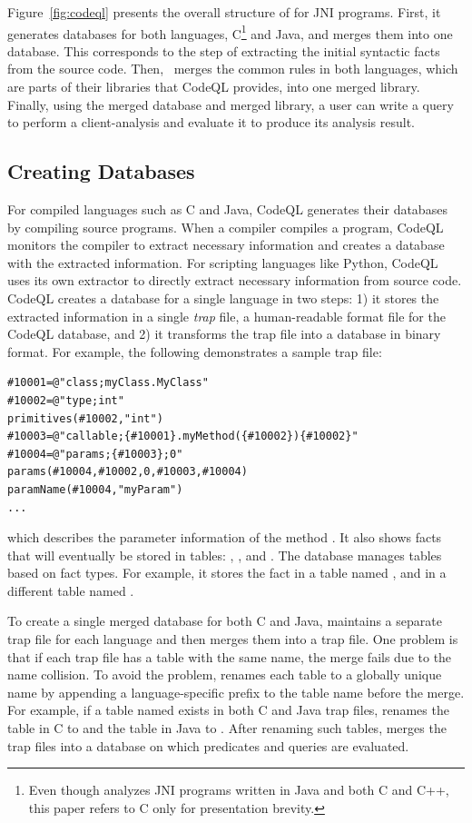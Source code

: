 Figure~\ref{fig:codeql} presents the overall structure of \ours for JNI
programs.  First, it generates databases for both languages, C\footnote{ Even
though \ours analyzes JNI programs written in Java and both C and C++, this
paper refers to C only for presentation brevity.} and Java, and merges them
into one database.  This corresponds to the step of extracting the initial
syntactic facts from the source code.  Then, \ours~merges the common rules in
both languages, which are parts of their libraries that CodeQL provides, into
one merged library.  Finally, using the merged database and merged library, a
user can write a query to perform a client-analysis and evaluate it to produce
its analysis result.

\subsection{Creating Databases}
For compiled languages such as C and Java, CodeQL generates their databases by
compiling source programs.  When a compiler compiles a program, CodeQL monitors
the compiler to extract necessary information and creates a database with the
extracted information. For scripting languages like Python, CodeQL uses its own
extractor to directly extract necessary information from source code.  CodeQL
creates a database for a single language in two steps: 1) it stores the
extracted information in a single \textit{trap} file, a human-readable format file for
the CodeQL database, and 2) it transforms the trap file into a database in
binary format.  For example, the following demonstrates a sample trap file:

\begin{lstlisting}[style=java,numbers=none]
#10001=@"class;myClass.MyClass"
#10002=@"type;int"
primitives(#10002,"int")
#10003=@"callable;{#10001}.myMethod({#10002}){#10002}"
#10004=@"params;{#10003};0"
params(#10004,#10002,0,#10003,#10004)
paramName(#10004,"myParam")
...
\end{lstlisting}

\noindent
which describes the parameter information of the method .
It also shows facts that will eventually be stored in tables:
, , and
.  The database manages tables based on fact types.
For example, it stores the fact  in a table named
, and  in a different table named
.

To create a single merged database for both C and Java, \ours maintains a
separate trap file for each language and then merges them into a trap file.
One problem is that if each trap file has a table with the same name, the merge
fails due to the name collision.  To avoid the problem, \ours renames each
table to a globally unique name by appending a language-specific prefix to the
table name before the merge.  For example, if a table named 
exists in both C and Java trap files, \ours renames the table in C to
 and the table in Java to .  After
renaming such tables, \ours merges the trap files into a database on which
predicates and queries are evaluated.


